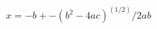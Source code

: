 \documentclass[preview]{standalone}
\begin{document}
\begin{align*}
x=-b +- (b^2-4ac)^(1/2)/2ab
\end{align*}
\end{document}
